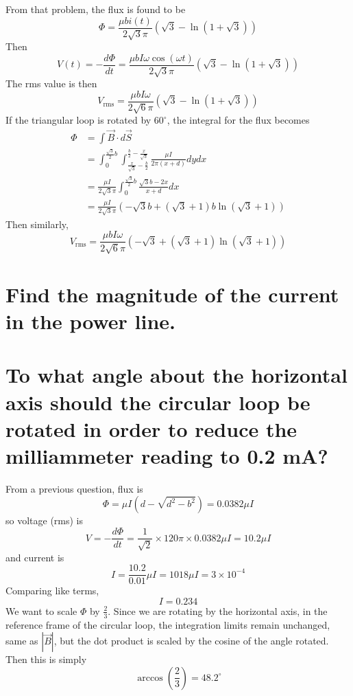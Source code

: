 \documentclass[answers]{exam}
\begin{document}
\begin{questions}
\begin{solution}
    From that problem, the flux is found to be
    $$\Phi = \frac{\mu bi(t)}{2\sqrt{3}\pi} (\sqrt{3} - \ln(1+\sqrt{3}))$$
    Then
    $$V(t) = -\frac{d\Phi}{dt} = \frac{\mu bI\omega\cos(\omega t)}{2\sqrt{3}\pi} (\sqrt{3} - \ln(1+\sqrt{3}))$$
    The rms value is then
    $$V_{\text{rms}} = \frac{\mu bI\omega}{2\sqrt{6}\pi}(\sqrt{3} - \ln(1+\sqrt{3}))$$
    If the triangular loop is rotated by $60^\circ$, the integral for the flux becomes
    \begin{align*}
        \Phi &= \int \vec B \cdot d\vec S \\ 
             &= \int_0^{\frac{\sqrt{3}}{2}b} \int_{\frac{x}{\sqrt{3}} - \frac{b}{2}}^{\frac{b}{2} - \frac{x}{\sqrt{3}}} \frac{\mu I}{2\pi(x+d)}dydx \\
             &= \frac{\mu I}{2\sqrt{3}\pi} \int_0^{\frac{\sqrt{3}}{2}b} \frac{\sqrt{3}b - 2x}{x+d} dx \\
             &= \frac{\mu I}{2\sqrt{3}\pi} (-\sqrt{3}b + (\sqrt{3} + 1)b\ln(\sqrt{3}+1))
    \end{align*}
    Then similarly,
    $$V_{\text{rms}} = \frac{\mu bI\omega}{2\sqrt{6}\pi} (-\sqrt{3} + (\sqrt{3} + 1)\ln(\sqrt{3}+1))$$
\end{solution}


\begin{parts}
    \part{Find the magnitude of the current in the power line.}
    \part{To what angle about the horizontal axis should the circular loop be rotated in order to reduce the milliammeter reading to 0.2 mA?}
\end{parts}

\begin{solution}
    From a previous question, flux is
    $$\Phi = \mu I(d-\sqrt{d^2-b^2}) = 0.0382\mu I$$
    so voltage (rms) is
    $$V = -\frac{d\Phi}{dt} = \frac{1}{\sqrt{2}} \times 120\pi \times 0.0382 \mu I = 10.2\mu I$$
    and current is
    $$I = \frac{10.2}{0.01}\mu I = 1018\mu I = 3\times10^{-4}$$
    Comparing like terms,
    $$I = 0.234$$
    We want to scale $\Phi$ by $\frac{2}{3}$. Since we are rotating by the horizontal axis, in the reference frame of the circular loop, the integration limits remain unchanged, same as $|\vec B|$, but the dot product is scaled by the cosine of the angle rotated. Then this is simply
    $$\arccos\left(\frac{2}{3}\right) = 48.2^\circ$$
\end{solution}


\end{questions}
\end{document}
